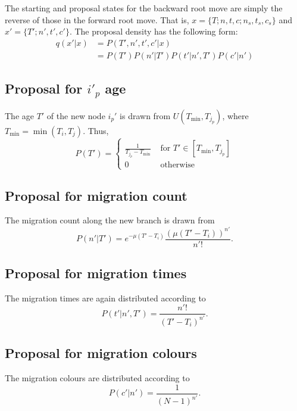 \documentclass[a4paper,11pt]{article}
\begin{document}
The starting and proposal states for the backward root move are simply
the reverse of those in the forward root move. That is,
$x=\{T;n,t,c;n_s,t_s,c_s\}$ and $x'=\{T';n',t',c'\}$. The proposal
density has the following form:
\begin{align}
  q(x'|x) &= P(T',n',t',c'|x)\nonumber\\
&= P(T')P(n'|T')P(t'|n',T')P(c'|n')
\end{align}

\subsection{Proposal for $i'_p$ age}

The age $T'$ of the new node $i_p'$ is drawn from
$U(T_{\min},T_{j_p})$, where $T_{\min}=\min(T_i,T_j)$. Thus,
\begin{equation}
  P(T')=\left\{\begin{array}{rl}
\frac{1}{T_{j_p}-T_{\min}} & \text{ for }T'\in[T_{\min},T_{j_p}]\\
0 & \text{ otherwise}\end{array}\right.
\end{equation}

\subsection{Proposal for migration count}

The migration count along the new branch is drawn from
\begin{equation}
  P(n'|T')=e^{-\mu(T'-T_i)}\frac{(\mu(T'-T_i))^{n'}}{n'!}.
\end{equation}

\subsection{Proposal for migration times}

The migration times are again distributed according to
\begin{equation}
  P(t'|n',T')=\frac{n'!}{(T'-T_i)^{n'}}.
\end{equation}

\subsection{Proposal for migration colours}
The migration colours are distributed according to
\begin{equation}
  P(c'|n')=\frac{1}{(N-1)^{n'}}.
\end{equation}
\end{document}
